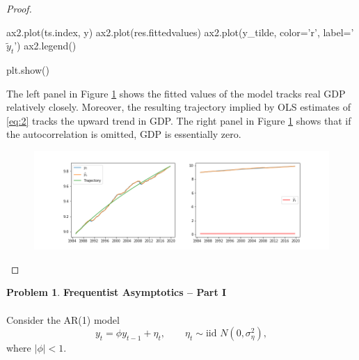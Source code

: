 \documentclass[oneside,reqno]{amsart}
\theoremstyle{definition}
\newtheorem{prob}{Problem}
\begin{document}
\begin{enumerate}
\begin{proof}
\begin{python3code}
ax2.plot(ts.index, y)
ax2.plot(res.fittedvalues)
ax2.plot(y_tilde, color='r', label='$\tilde y_t$')
ax2.legend()

plt.show()
\end{python3code}

The left panel in Figure \ref{q1-fig} shows the fitted values of the model tracks real GDP relatively closely. Moreover, the resulting trajectory implied by OLS estimates of \eqref{eq:2} tracks the upward trend in GDP. The right panel in Figure \ref{q1-fig} shows that if the autocorrelation is omitted, GDP is essentially zero. 

\begin{figure}[!h]
\includegraphics[width=\textwidth]{q1-fig}
\caption{}
\label{q1-fig}
\end{figure}
\end{proof}

\end{enumerate}

\begin{prob}
\textbf{Frequentist Asymptotics -- Part I}
\\ \\
Consider the AR(1) model 
\[
	y_t = \phi y_{t-1} + \eta_t, \qquad \eta_t \sim \text{iid } N(0, \sigma_\eta^2),
\]
where $|\phi| <1$.
\end{prob}
\end{document}
